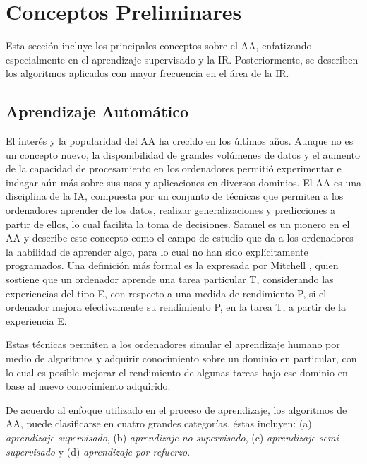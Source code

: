 \documentclass[journal]{IEEEtran}
\begin{document}
\section{Conceptos Preliminares}

Esta sección incluye los principales conceptos sobre el AA, enfatizando especialmente en el aprendizaje supervisado y la IR. Posteriormente, se describen los algoritmos aplicados con mayor frecuencia en el área de la IR.

\subsection{Aprendizaje Automático}

El interés y la popularidad del AA ha crecido en los últimos años. Aunque no es un concepto nuevo, la disponibilidad de grandes volúmenes de datos y el aumento de la capacidad de procesamiento en los ordenadores permitió experimentar e indagar aún más sobre sus usos y aplicaciones en diversos dominios.
El AA es una disciplina de la IA, compuesta por un conjunto de técnicas que permiten a los ordenadores aprender de los datos, realizar generalizaciones y predicciones a partir de ellos, lo cual facilita la toma de decisiones. Samuel \cite{samuel1959some} es un pionero en el AA y describe este concepto como el campo de estudio que da a los ordenadores la habilidad de aprender algo, para lo cual no han sido explícitamente programados. Una definición más formal es la expresada por Mitchell \cite{mitchell1997machine}, quien sostiene que un ordenador aprende una tarea particular T, considerando las experiencias del tipo E, con respecto a una medida de rendimiento P, si el ordenador mejora efectivamente su rendimiento P, en la tarea T, a partir de la experiencia E.

Estas técnicas permiten a los ordenadores simular el aprendizaje humano por medio de algoritmos y adquirir conocimiento sobre un dominio en particular, con lo cual es posible mejorar el rendimiento de algunas tareas bajo ese dominio en base al nuevo conocimiento adquirido.

De acuerdo al enfoque utilizado en el proceso de aprendizaje, los algoritmos de AA, puede clasificarse en cuatro grandes categorías, éstas incluyen: (a) \textit{aprendizaje supervisado}, (b) \textit{aprendizaje no supervisado}, (c) \textit{aprendizaje semi-supervisado} y (d) \textit{aprendizaje por refuerzo}. 
\end{document}
